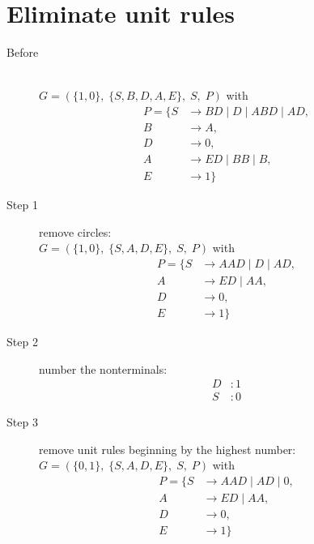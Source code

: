 \documentclass{article}
\begin{document}
\section{Eliminate unit rules}
\begin{description}
	\item[Before] \hfill \\ 
	$G=\left(\{	1, 0\},\;\{ S, B, D, A, E\},\;S,\;P\right)$ with
	\begin{align*}
		P=\{	S &\rightarrow BD\;|\;D\;|\;ABD\;|\;AD, \\ 
		B &\rightarrow A, \\ 
		D &\rightarrow 0, \\ 
		A &\rightarrow ED\;|\;BB\;|\;B, \\ 
		E &\rightarrow 1\}
	\end{align*}
	\item[Step 1] remove circles: \\ 
	$G=\left(\{	1, 0\},\;\{ S, A, D, E\},\;S,\;P\right)$ with
	\begin{align*}
		P=\{	S &\rightarrow AAD\;|\;D\;|\;AD, \\ 
		A &\rightarrow ED\;|\;AA, \\ 
		D &\rightarrow 0, \\ 
		E &\rightarrow 1\}
	\end{align*}
	\item[Step 2] number the nonterminals:
	\begin{align*}
		D&: 1\\
		S&: 0
	\end{align*}
	\item[Step 3] remove unit rules beginning by the highest number: \\ 
	$G=\left(\{	0, 1\},\;\{ S, A, D, E\},\;S,\;P\right)$ with
	\begin{align*}
		P=\{	S &\rightarrow AAD\;|\;AD\;|\;0, \\ 
		A &\rightarrow ED\;|\;AA, \\ 
		D &\rightarrow 0, \\ 
		E &\rightarrow 1\}
	\end{align*}
\end{description}
\end{document}
